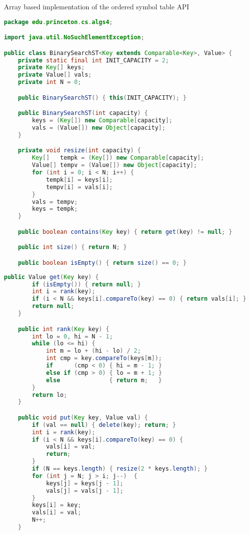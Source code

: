 \documentclass[8pt,a4paper,compress]{beamer}
\begin{document}
\begin{frame}[fragile]
Array based implementation of the ordered symbol table API

\begin{lstlisting}[language=Java]
package edu.princeton.cs.algs4;

import java.util.NoSuchElementException;

public class BinarySearchST<Key extends Comparable<Key>, Value> {
    private static final int INIT_CAPACITY = 2;
    private Key[] keys;
    private Value[] vals;
    private int N = 0;

    public BinarySearchST() { this(INIT_CAPACITY); }   

    public BinarySearchST(int capacity) { 
        keys = (Key[]) new Comparable[capacity]; 
        vals = (Value[]) new Object[capacity]; 
    }   

    private void resize(int capacity) {
        Key[]   tempk = (Key[]) new Comparable[capacity];
        Value[] tempv = (Value[]) new Object[capacity];
        for (int i = 0; i < N; i++) {
            tempk[i] = keys[i];
            tempv[i] = vals[i];
        }
        vals = tempv;
        keys = tempk;
    }

    public boolean contains(Key key) { return get(key) != null; }

    public int size() { return N; }

    public boolean isEmpty() { return size() == 0; }
\end{lstlisting}
\end{frame}

\begin{frame}[fragile]
\begin{lstlisting}[language=Java]
    public Value get(Key key) {
        if (isEmpty()) { return null; }
        int i = rank(key); 
        if (i < N && keys[i].compareTo(key) == 0) { return vals[i]; }
        return null;
    } 

    public int rank(Key key) {
        int lo = 0, hi = N - 1; 
        while (lo <= hi) { 
            int m = lo + (hi - lo) / 2; 
            int cmp = key.compareTo(keys[m]); 
            if      (cmp < 0) { hi = m - 1; }
            else if (cmp > 0) { lo = m + 1; } 
            else              { return m;   }
        } 
        return lo;
    } 

    public void put(Key key, Value val) {
        if (val == null) { delete(key); return; }
        int i = rank(key);
        if (i < N && keys[i].compareTo(key) == 0) {
            vals[i] = val;
            return;
        }
        if (N == keys.length) { resize(2 * keys.length); }
        for (int j = N; j > i; j--)  {
            keys[j] = keys[j - 1];
            vals[j] = vals[j - 1];
        }
        keys[i] = key;
        vals[i] = val;
        N++;
    } 
\end{lstlisting}
\end{frame}
\end{document}
